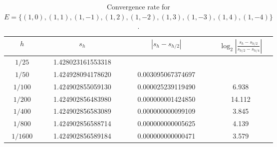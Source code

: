 \documentclass[10pt]{article}
\theoremstyle{definition}
\numberwithin{equation}{section}
\numberwithin{figure}{section}
\numberwithin{table}{section}
\begin{document}
\begin{table}[b]
\centering
\begin{tabular}{c|ccc}
$h$&$s_h$&$|s_h-s_{h/2}|$&$\log_2\left|\frac{s_h-s_{h/2}}{s_{h/2}-s_{h/4}}\right|$\\\hline
$1/25$ & 1.428023161553318 &  & \\
$1/50$ & 1.424928094178620 & 0.003095067374697  & \\
$1/100$ & 1.424902855059130 & 0.000025239119490  & 6.938 \\
$1/200$ & 1.424902856483980 & 0.000000001424850  & 14.112  \\
$1/400$ & 1.424902856583089 & 0.000000000099109 & 3.845 \\
$1/800$ & 1.424902856588714 & 0.000000000005625  & 4.139\\
$1/1600$ & 1.424902856589184 & 0.000000000000471 & 3.579\\
\end{tabular}
\caption{Convergence rate for $E=\{(1,0),(1,1),(1,-1),(1,2),(1,-2),(1,3),(1,-3),(1,4),(1,-4)\}$.}
\label{table:conv2dline}
\end{table}

\clearpage
\printbibliography
\end{document}

